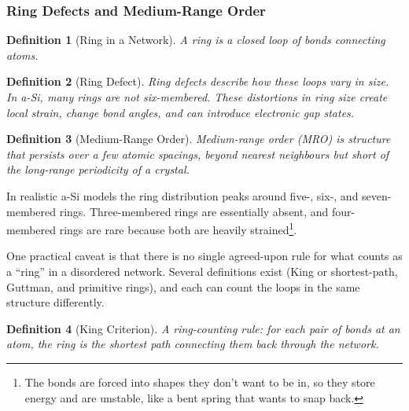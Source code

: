 \documentclass{article}
\newtheorem{definition}{Definition}
\begin{document}
\subsubsection{Ring Defects and Medium-Range Order}
\begin{definition}[Ring in a Network]
    A ring is a closed loop of bonds connecting atoms.
\end{definition}
\begin{definition}[Ring Defect]
    Ring defects describe how these loops vary in size. In a-Si, many rings are not six-membered. These distortions in ring size create local strain, change bond angles, and can introduce electronic gap states.
\end{definition}
\begin{definition}[Medium-Range Order]
    Medium-range order (MRO) is structure that persists over a few atomic spacings, beyond nearest neighbours but short of the long-range periodicity of a crystal.
\end{definition}
In realistic a-Si models the ring distribution peaks around five-, six-, and seven-membered rings. Three-membered rings are essentially absent, and four-membered rings are rare because both are heavily strained\footnote{The bonds are forced into shapes they don't want to be in, so they store energy and are unstable, like a bent spring that wants to snap back.}.

One practical caveat is that there is no single agreed-upon rule for what counts as a ``ring'' in a disordered network. Several definitions exist (King or shortest-path, Guttman, and primitive rings), and each can count the loops in the same structure differently.
\begin{definition}[King Criterion]
    A ring-counting rule: for each pair of bonds at an atom, the ring is the shortest path connecting them back through the network.
\end{definition}
\end{document}
